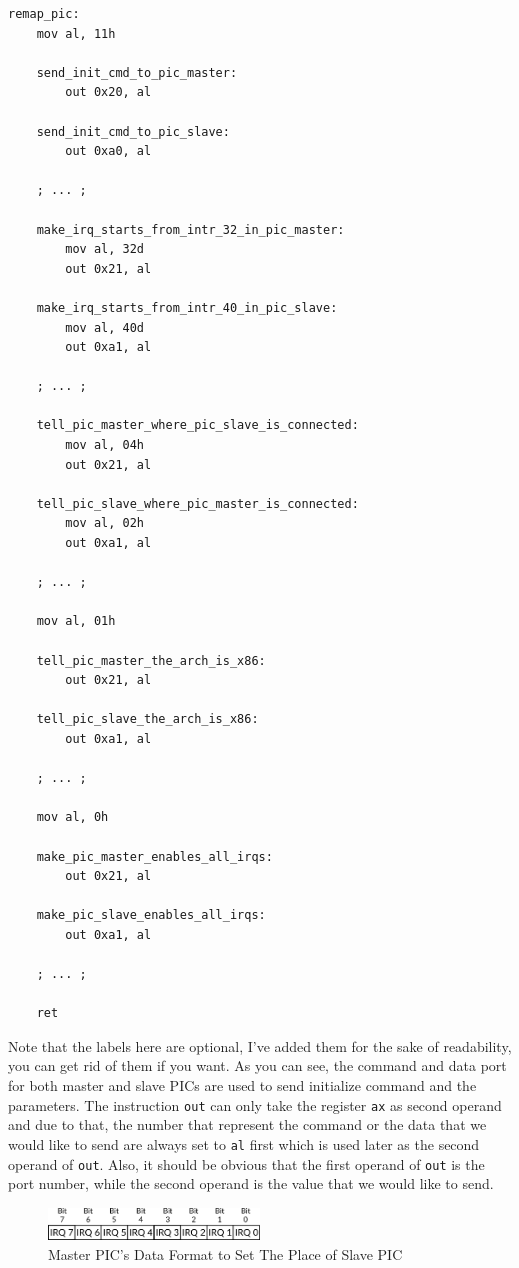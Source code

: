 \begin{lstlisting}
remap_pic:
    mov al, 11h
    
    send_init_cmd_to_pic_master:    
        out 0x20, al
        
    send_init_cmd_to_pic_slave:     
        out 0xa0, al
        
    ; ... ;
    
    make_irq_starts_from_intr_32_in_pic_master:     
        mov al, 32d
        out 0x21, al
    
    make_irq_starts_from_intr_40_in_pic_slave:
        mov al, 40d
        out 0xa1, al 
    
    ; ... ;
    
    tell_pic_master_where_pic_slave_is_connected:
        mov al, 04h
        out 0x21, al
    
    tell_pic_slave_where_pic_master_is_connected:
        mov al, 02h
        out 0xa1, al
    
    ; ... ;
    
    mov al, 01h
    
    tell_pic_master_the_arch_is_x86:
        out 0x21, al
    
    tell_pic_slave_the_arch_is_x86:
        out 0xa1, al
    
    ; ... ;
    
    mov al, 0h
    
    make_pic_master_enables_all_irqs:
        out 0x21, al
    
    make_pic_slave_enables_all_irqs:
        out 0xa1, al
    
    ; ... ;
    
    ret
\end{lstlisting}

Note that the labels here are optional, I've added them for the sake of
readability, you can get rid of them if you want. As you can see, the
command and data port for both master and slave PICs are used to send
initialize command and the parameters. The instruction \lstinline!out!
can only take the register \lstinline!ax! as second operand and due to
that, the number that represent the command or the data that we would
like to send are always set to \lstinline!al! first which is used later
as the second operand of \lstinline!out!. Also, it should be obvious
that the first operand of \lstinline!out! is the port number, while the
second operand is the value that we would like to send.

\begin{figure}
\centering
\includegraphics[width=0.50000\textwidth]{Figures/progenitor-ch/Fig27082021_0.png}
\caption{Master PIC's Data Format to Set The Place of Slave
PIC}\label{fig:27082021_0}
\end{figure}

